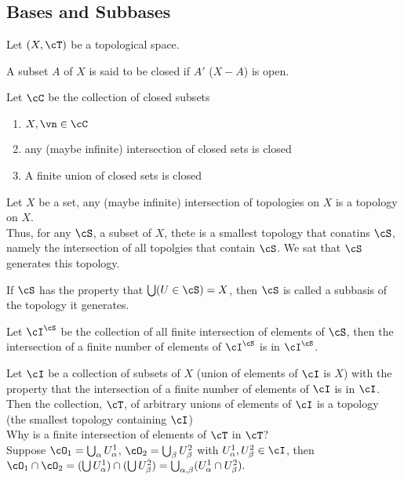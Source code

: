 
\subsection{Bases and Subbases}

Let $(X, \cT)$ be a topological space. 

\begin{definition}
    A subset $A$ of $X$ is said to be closed if $A'$ ($X-A$) is open. 
\end{definition}

\noindent
Let $\cC$ be the collection of closed subsets 
\begin{enumerate}
    \item $X, \vn \in \cC$
    \item any (maybe infinite) intersection of closed sets is closed
    \item A finite union of closed sets is closed 
\end{enumerate}

\noindent 
Let $X$ be a set, any (maybe infinite) intersection of topologies on $X$ is a topology on $X$. \\
Thus, for any $\cS$, a subset of $X$, thete is a smallest topology that conatins $\cS$, namely the intersection of all topolgies that contain $\cS$. We sat that $\cS$ generates this topology. 

\begin{definition}
    If $\cS$ has the property that $\bigcup (U \in \cS) = X$, then $\cS$ is called a subbasis of the topology it generates. 
\end{definition}

\noindent
Let $\cI^{\cS}$ be the collection of all finite intersection of elements of $\cS$, then the intersection of a finite number of elements of $\cI^{\cS}$ is in $\cI^{\cS}$. 

\noindent
Let $\cI$ be a collection of subsets of $X$ (union of elements of $\cI$ is $X$) with the property that the intersection of a finite number of elements of $\cI$ is in $\cI$. Then the collection, $\cT$, of arbitrary unions of elements of $\cI$ is a topology (the smallest topology containing $\cI$) \\
Why is a finite intersection of elements of $\cT$ in $\cT$?  \\
Suppose $\cO_1 = \bigcup_{\alpha}U_{\alpha}^1$, $\cO_2 = \bigcup_{\beta} U_{\beta}^2$ with $U_{\alpha}^1 , U_{\beta}^2 \in \cI$, then $\cO_1 \cap \cO_2 = (\bigcup U_{\alpha}^1) \cap (\bigcup U_{\beta}^2) = \bigcup_{\alpha, \beta} (U_{\alpha}^1 \cap U_{\beta}^2).$

